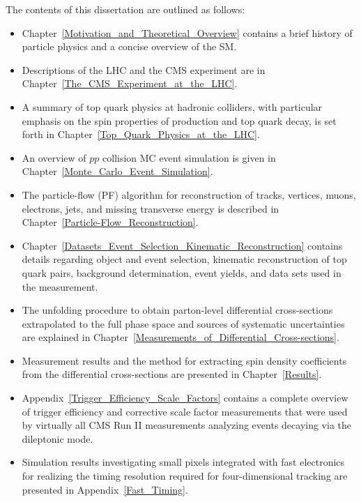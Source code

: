 The contents of this dissertation are outlined as follows:
\begin{itemize}
    \item Chapter~\ref{Motivation_and_Theoretical_Overview} contains a brief history of particle physics and a concise overview of the SM.
    \item Descriptions of the LHC and the CMS experiment are in Chapter~\ref{The_CMS_Experiment_at_the_LHC}.
    \item A summary of top quark physics at hadronic colliders, with particular emphasis on the spin properties of \ttbar production and top quark decay, is set forth in Chapter~\ref{Top_Quark_Physics_at_the_LHC}. 
    \item An overview of $pp$ collision MC event simulation is given in Chapter~\ref{Monte_Carlo_Event_Simulation}.
    \item The particle-flow (PF) algorithm for reconstruction of tracks, vertices, muons, electrons, jets, and missing transverse energy is described in Chapter~\ref{Particle-Flow_Reconstruction}.
    \item Chapter~\ref{Datasets_Event_Selection_Kinematic_Reconstruction} contains details regarding object and event selection, kinematic reconstruction of top quark pairs, background determination, event yields, and data sets used in the measurement.
    \item The unfolding procedure to obtain parton-level differential cross-sections extrapolated to the full phase space and sources of systematic uncertainties are explained in Chapter~\ref{Measurements_of_Differential_Cross-sections}.
    \item Measurement results and the method for extracting spin density coefficients from the differential cross-sections are presented in Chapter~\ref{Results}.
    \item Appendix~\ref{Trigger_Efficiency_Scale_Factors} contains a complete overview of trigger efficiency and corrective scale factor measurements that were used by virtually all CMS Run II measurements analyzing \ttbar events decaying via the dileptonic mode.
    \item Simulation results investigating small pixels integrated with fast electronics for realizing the timing resolution required for four-dimensional tracking are presented in Appendix~\ref{Fast_Timing}.
\end{itemize}